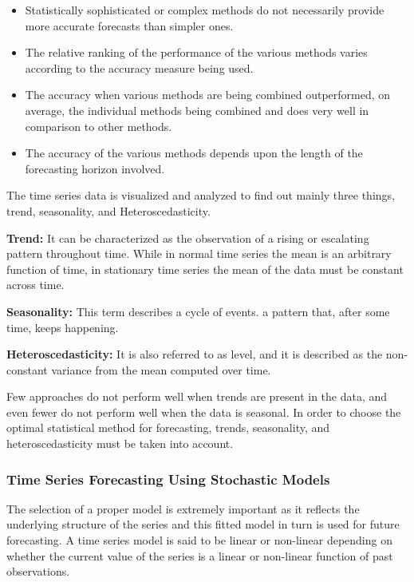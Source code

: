 \documentclass[
  onepage,
  openany]{scrbook}
\begin{document}
\begin{itemize}
\item
  Statistically sophisticated or complex methods do not necessarily
  provide more accurate forecasts than simpler ones.
\item
  The relative ranking of the performance of the various methods varies
  according to the accuracy measure being used.
\item
  The accuracy when various methods are being combined outperformed, on
  average, the individual methods being combined and does very well in
  comparison to other methods.
\item
  The accuracy of the various methods depends upon the length of the
  forecasting horizon involved.
\end{itemize}

The time series data is visualized and analyzed to find out mainly three
things, trend, seasonality, and Heteroscedasticity.

\textbf{Trend:} It can be characterized as the observation of a rising
or escalating pattern throughout time. While in normal time series the
mean is an arbitrary function of time, in stationary time series the
mean of the data must be constant across time.

\textbf{Seasonality:} This term describes a cycle of events. a pattern
that, after some time, keeps happening.

\textbf{Heteroscedasticity:} It is also referred to as level, and it is
described as the non-constant variance from the mean computed over time.

Few approaches do not perform well when trends are present in the data,
and even fewer do not perform well when the data is seasonal. In order
to choose the optimal statistical method for forecasting, trends,
seasonality, and heteroscedasticity must be taken into account.

\hypertarget{time-series-forecasting-using-stochastic-models}{%
\subsubsection{\texorpdfstring{\textbf{Time Series Forecasting Using
Stochastic
Models}}{Time Series Forecasting Using Stochastic Models}}\label{time-series-forecasting-using-stochastic-models}}

The selection of a proper model is extremely important as it reflects
the underlying structure of the series and this fitted model in turn is
used for future forecasting. A time series model is said to be linear or
non-linear depending on whether the current value of the series is a
linear or non-linear function of past observations.
\end{document}
